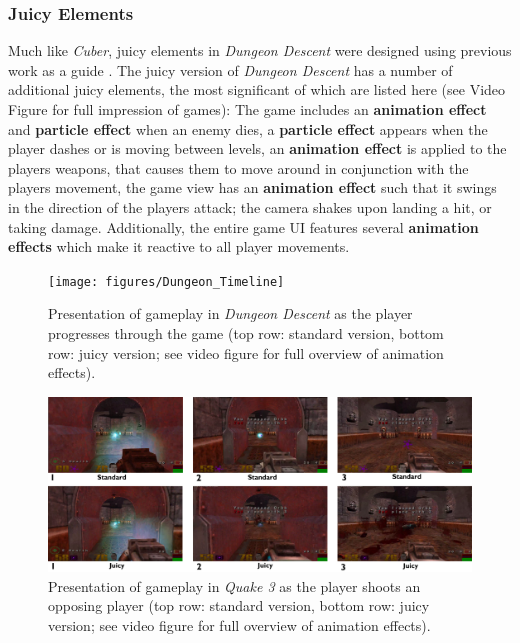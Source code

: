 \documentclass{sigchi}
\begin{document}
\subsubsection{Juicy Elements}
Much like \textit{Cuber}, juicy elements in \textit{Dungeon Descent} were designed using previous work as a guide \cite{deterding2015lens,hicks2018juicy,juul2016good}. The juicy version of \textit{Dungeon Descent} has a number of additional juicy elements, the most significant of which are listed here (see Video Figure for full impression of games): The game includes an \textbf{animation effect} and \textbf{particle effect} when an enemy dies, a \textbf{particle effect} appears when the player dashes or is moving between levels, an \textbf{animation effect} is applied to the players weapons, that causes them to move around in conjunction with the players movement, the game view has an \textbf{animation effect} such that it swings in the direction of the players attack; the camera shakes upon landing a hit, or taking damage. Additionally, the entire game UI features several \textbf{animation effects} which make it reactive to all player movements. 

\begin{figure}
	\texttt{[image: figures/Dungeon\_Timeline]}
	\caption{Presentation of gameplay in \textit{Dungeon Descent} as the player progresses through the game (top row: standard version, bottom row: juicy version; see video figure for full overview of animation effects).}
	\label{figure:dungeonjuicy}
\end{figure}
\begin{figure}
	\includegraphics[width=\textwidth]{figures/Quake_Timeline.png}
	\caption{Presentation of gameplay in \textit{Quake 3} as the player shoots an opposing player (top row: standard version, bottom row: juicy version; see video figure for full overview of animation effects).}
	\label{figure:quaketimeline}
\end{figure}
\end{document}
